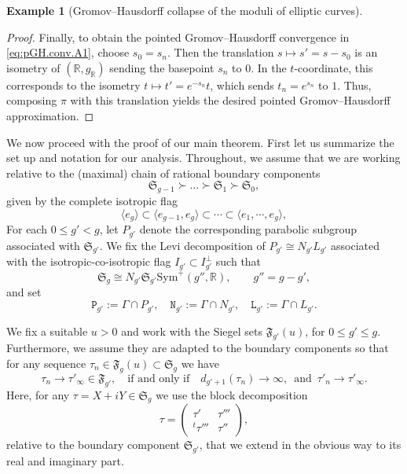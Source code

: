 \documentclass[11pt]{amsart}
\theoremstyle{plain}
\theoremstyle{definition}
\newtheorem{example}[theorem]{Example}
\theoremstyle{remark}
\newcommand{\R}{\mathbb R}
\newcommand{\fS}{\mathfrak{S}}
\newcommand{\sym}{\mathrm{Sym}^{\!+}}
\newcommand{\tP}{\mathtt{P}}
\newcommand{\tN}{\mathtt{N}}
\newcommand{\tL}{\mathtt{L}}
\newcommand{\fF}{\mathfrak{F}}
\begin{document}
\begin{example}[Gromov--Hausdorff collapse of the moduli of elliptic curves]
\begin{proof}
    Finally, to obtain the pointed Gromov--Hausdorff convergence in \eqref{eq:pGH.conv.A1}, choose $s_0=s_n$. Then the translation
    $s\mapsto s'=s-s_0$ is an isometry of $(\R,g_{\scriptscriptstyle{\R}})$ sending the basepoint $s_n$ to $0$.
    In the $t$-coordinate, this corresponds to the isometry $t\mapsto t'=e^{-s_n}t$, which sends $t_n=e^{s_n}$ to $1$.
    Thus, composing $\pi$ with this translation yields the desired pointed Gromov--Hausdorff approximation.
    \end{proof}
\end{example}

We now proceed with the proof of our main theorem. First let us summarize the set up and notation for our analysis. Throughout, we assume that we are working relative to the (maximal) chain of rational boundary components
\[
    \fS_{g-1} \succ \dots \succ \fS_1 \succ \fS_0,
\]
given by the complete isotropic flag 
\[
    \langle e_g\rangle\subset\langle e_{g-1},e_g\rangle\subset\cdots\subset\langle e_1,\cdots, e_g\rangle,
\]
For each $0\leq g'<g$, let $P_{g'}$ denote the corresponding parabolic subgroup associated with $\fS_{g'}$. We fix the Levi decomposition of $P_{g'}\cong N_{g'}L_{g'}$ associated with the isotropic-co-isotropic flag $I_{g'}\subset I_{g'}^\perp$ such that
\[
\fS_{g}\cong N_{g'}\fS_{g'}\sym(g'',\R),
\qquad
g''=g-g',
\]
and set 
\[
\tP_{g'}:=\Gamma\cap P_{g'},\quad \tN_{g'}:=\Gamma\cap N_{g'},\quad \tL_{g'}:=\Gamma\cap L_{g'}.
\]

We fix a suitable $u>0$ and work with the Siegel sets $\fF_{g'}(u)$, for $0\leq g'\leq g$. Furthermore, we assume they are adapted to the boundary components so that for any sequence $\tau_n\in\fF_g(u)\subset\fS_g$ we have
\begin{equation}\label{eq:sieg.set.direc}
    \tau_n\to \tau'_\infty \in \fF_{g'},\quad \text{if and only if}\quad  d_{g'+1}(\tau_n)\to \infty, \,\text{ and }\, \tau'_n\to \tau'_\infty.
\end{equation}
Here, for any $\tau =X+iY \in \fS_g$ we use the block decomposition   
\begin{equation}
    \tau=\begin{pmatrix}
        \tau'&\tau'''\\
        {}^t\tau'''&\tau''
    \end{pmatrix},
\end{equation}
relative to the boundary component $\fS_{g'}$, that we extend in the obvious way to its real and imaginary part. 
\end{document}
